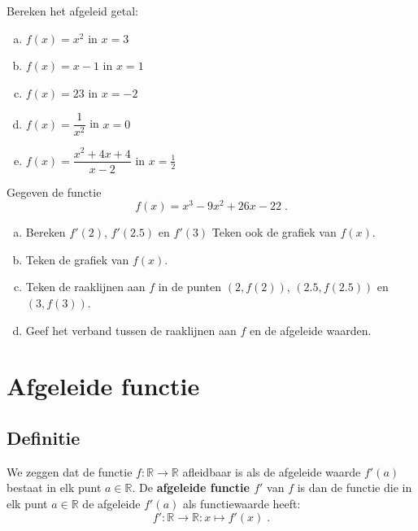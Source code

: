\documentclass[12pt]{article}
\newenvironment{definitie}
{
  \begin{mdframed}[nobreak=true,frametitle={Definitie}]
  }{%
  \end{mdframed}
}
\begin{document}
\begin{oefening}
  Bereken het afgeleid getal:
  \begin{enumerate}[(a)]
  \item $f(x)=x^2$ in $x=3$
  \item $f(x)=x-1$ in $x=1$
  \item $f(x)=23$ in $x=-2$
  \item $f(x)=\dfrac{1}{x^2}$ in $x=0$
  \item $f(x)=\dfrac{x^2+4x+4}{x-2}$ in $x=\frac{1}{2}$
  \end{enumerate}
\end{oefening}

\begin{oefening}
  Gegeven de functie
  $$f(x)=x^3-9x^2+26x-22\;.$$
  \begin{enumerate}[(a)]
  \item Bereken $f'(2)$, $f'(2.5)$ en $f'(3)$ Teken ook de grafiek van $f(x)$.
  \item Teken de grafiek van $f(x)$.
  \item Teken de raaklijnen aan $f$ in de punten $(2, f(2))$, $(2.5, f(2.5))$ en $(3, f(3))$.
  \item Geef het verband tussen de raaklijnen aan $f$ en de afgeleide waarden.
  \end{enumerate}
\end{oefening}

\pagebreak
\section{Afgeleide functie}

\subsection{Definitie}

\begin{definitie}
  We zeggen dat de functie $f:\mathbb{R}\to\mathbb{R}$ afleidbaar is als de afgeleide waarde $f'(a)$ bestaat in elk punt $a\in\mathbb{R}$. De {\bf afgeleide functie $f'$} van $f$ is dan de functie die in elk punt $a\in\mathbb{R}$ de afgeleide $f'(a)$ als functiewaarde heeft:
  $$f':\mathbb{R}\to\mathbb{R}:x\mapsto f'(x)\;.$$
\end{definitie}
\end{document}
